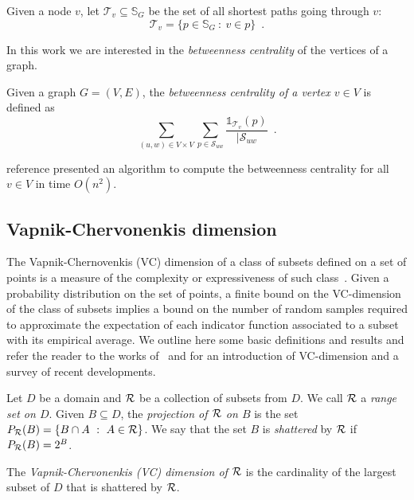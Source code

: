 Given a node $v$, let $\mathcal{T}_v\subseteq\mathbb{S}_G$ be the set of all
shortest paths going through $v$:
\[
\mathcal{T}_v=\{p\in\mathbb{S}_G ~:~ v\in p\}\enspace.
\]

In this work we are interested in the \emph{betweenness centrality} of the
vertices of a graph.
\begin{definition}\label{def:betwenness}
  Given a graph $G=(V,E)$, the \emph{betweenness centrality of a vertex $v\in
  V$} is defined as
  \[
  \sum_{(u,w)\in V\times V}\sum_{p\in\mathcal{S}_{uw}}\frac{\mathds{1}_{\mathcal{T}_v}(p)}{|\mathcal{S}_{uw}}\enspace.
  \]
\end{definition} 

\XXX reference \MR presented an algorithm to compute the betweenness centrality for
all $v\in V$ in time $O(n^2)$. 

\subsection{Vapnik-Chervonenkis dimension}\label{sec:prelvcdim}
The Vapnik-Chernovenkis (VC) dimension of a class of subsets defined
on a set of points is a measure of the complexity or expressiveness of such
class~\citep{VapnikC71}. Given a probability distribution on the set of points,
a finite bound on the VC-dimension of the class of subsets implies a bound on
the number of random samples required to approximate the expectation of each
indicator function associated to a subset with its empirical average. We outline
here some basic definitions and results and refer the reader to the works
of~\citet[Sect.~14.4]{AlonS08} and \citet[Sect.~3]{BoucheronBL05} for an
introduction of VC-dimension and a survey of recent developments. 

Let $D$ be a domain and $\mathcal{R}$ be a collection of subsets from $D$. We call
$\mathcal{R}$ a \emph{range set on $D$}.
Given $B\subseteq D$, the \emph{projection of $\mathcal{R}$ on $B$} is the set 
$P_{\mathcal{R}}(B)=\{ B\cap A ~:~ A\in\mathcal{R}\}$. We say that the set $B$ is
\emph{shattered} by $\mathcal{R}$ if $P_{\mathcal{R}}(B)=2^B$.

\begin{definition}\label{def:vcdim}
  The \emph{Vapnik-Chervonenkis (VC) dimension of $\mathcal{R}$} is the cardinality
  of the largest subset of $D$ that is shattered by $\mathcal{R}$.
\end{definition}

